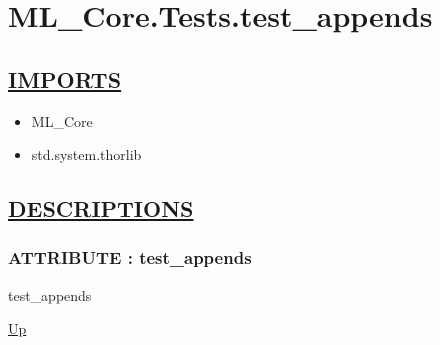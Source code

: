 \chapter*{ML\_Core.Tests.test\_appends}
\hypertarget{ecldoc:toc:ML_Core.Tests.test_appends}{}

\section*{\underline{IMPORTS}}
\begin{itemize}
\item ML\_Core
\item std.system.thorlib
\end{itemize}

\section*{\underline{DESCRIPTIONS}}
\subsection*{ATTRIBUTE : test\_appends}
\hypertarget{ecldoc:ml_core.tests.test_appends}{}
\begin{minipage}[t]{\textwidth}
\begin{flushleft}
 test\_appends 
\end{flushleft}
\end{minipage}
\hyperlink{ecldoc:toc:ML_Core/Tests}{Up}

\par
\par
